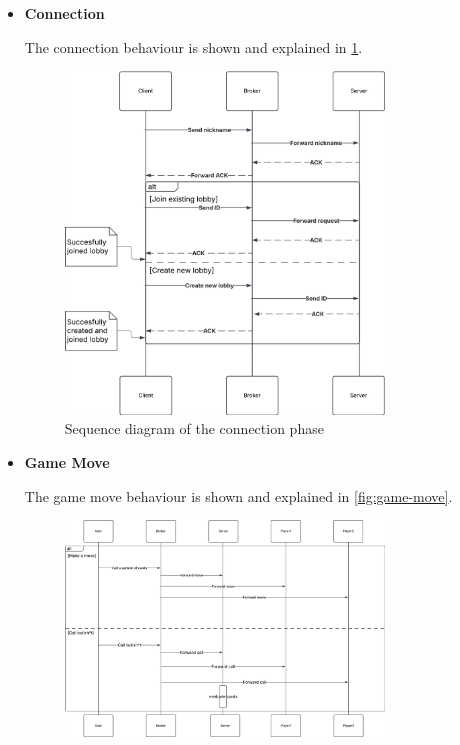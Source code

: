 \documentclass{scrartcl}
\begin{document}
\begin{itemize}
      \item \textbf{Connection} \par
            The connection behaviour is shown and explained in \cref{fig:connection}.
            \begin{figure}
                  \centering
                  \includegraphics[width=0.8\textwidth]{figures/sequenceConnection.png}
                  \caption{Sequence diagram of the connection phase}
                  \label{fig:connection}
            \end{figure}
      \item \textbf{Game Move} \par
            The game move behaviour is shown and explained in \cref{fig:game-move}.
            \begin{figure}
                  \centering
                  \includegraphics[width=0.8\textwidth]{figures/sequenceGameMove.png}

\end{figure}
\end{itemize}
\end{document}
